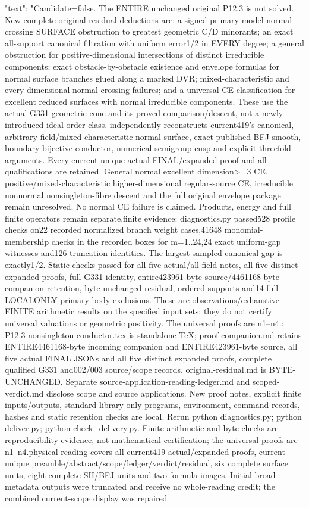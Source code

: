 \documentclass[11pt]{article}
\begin{document}
\begin{Full422Data}
{{      "text": "Candidate=false. The ENTIRE unchanged original P12.3 is not solved. New complete original-residual deductions are: a signed primary-model normal-crossing SURFACE obstruction to greatest geometric C/D minorants; an exact all-support canonical filtration with uniform error1/2 in EVERY degree; a general obstruction for positive-dimensional intersections of distinct irreducible components; exact obstacle-by-obstacle existence and envelope formulas for normal surface branches glued along a marked DVR; mixed-characteristic and every-dimensional normal-crossing failures; and a universal CE classification for excellent reduced surfaces with normal irreducible components. These use the actual G331 geometric cone and its proved comparison/descent, not a newly introduced ideal-order class.\n{} independently reconstructs current419's canonical, arbitrary-field/mixed-characteristic normal-surface, exact published BFJ smooth, boundary-bijective conductor, numerical-semigroup cusp and explicit threefold arguments. Every current unique actual FINAL/expanded proof and all qualifications are retained. General normal excellent dimension>=3 CE, positive/mixed-characteristic higher-dimensional regular-source CE, irreducible nonnormal nonsingleton-fibre descent and the full original envelope package remain unresolved. No normal CE failure is claimed. Products, energy and full finite operators remain separate.\n\nObserved finite evidence: diagnostics.py passed528 profile checks on22 recorded normalized branch weight cases,41648 monomial-membership checks in the recorded boxes for m=1..24,24 exact uniform-gap witnesses and126 truncation identities. The largest sampled canonical gap is exactly1/2. Static checks passed for all five actual/all-field notes, all five distinct expanded proofs, full G331 identity, entire423961-byte source/4461168-byte companion retention, byte-unchanged residual, ordered supports and14 full LOCALONLY primary-body exclusions. These are observations/exhaustive FINITE arithmetic results on the specified input sets; they do not certify universal valuations or geometric positivity. The universal proofs are n1--n4.\n\nDeliverables: P12.3-nonsingleton-conductor.tex is standalone TeX; proof-companion.md retains ENTIRE4461168-byte incoming companion and ENTIRE423961-byte source, all five actual FINAL JSONs and all five distinct expanded proofs, complete qualified G331 and002/003 source/scope records. original-residual.md is BYTE-UNCHANGED. Separate source-application-reading-ledger.md and scoped-verdict.md disclose scope and source applications. New proof notes, explicit finite inputs/outputs, standard-library-only programs, environment, command records, hashes and static retention checks are local. Rerun python diagnostics.py; python deliver.py; python check_delivery.py. Finite arithmetic and byte checks are reproducibility evidence, not mathematical certification; the universal proofs are n1--n4.\n\nFresh physical reading covers all current419 actual/expanded proofs, current unique preamble/abstract/scope/ledger/verdict/residual, six complete surface units, eight complete SH/BFJ units and two formula images. Initial broad metadata outputs were truncated and receive no whole-reading credit; the combined current-scope display was repaired }}
\end{Full422Data}
\end{document}
